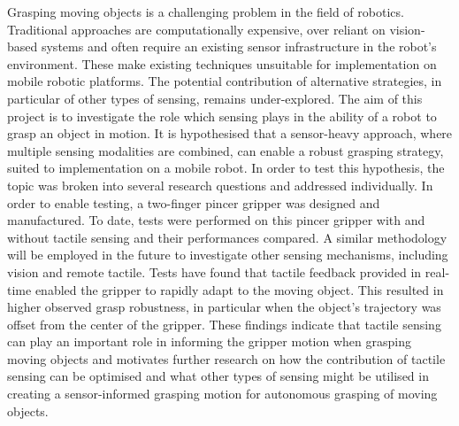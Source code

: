 % 
% 
%


Grasping moving objects is a challenging problem in the field of robotics. Traditional approaches are computationally expensive, over reliant on vision-based systems and often require an existing sensor infrastructure in the robot's environment. These make existing techniques unsuitable for implementation on mobile robotic platforms. The potential contribution of alternative strategies, in particular of other types of sensing, remains under-explored. 
The aim of this project is to investigate the role which sensing plays in the ability of a robot to grasp an object in motion. It is hypothesised that a sensor-heavy approach, where multiple sensing modalities are combined, can enable a robust grasping strategy, suited to implementation on a mobile robot.
In order to test this hypothesis, the topic was broken into several research questions and addressed individually. In order to enable testing, a two-finger pincer gripper was designed and manufactured. To date, tests were performed on this pincer gripper with and without tactile sensing and their performances compared. A similar methodology will be employed in the future to investigate other sensing mechanisms, including vision and remote tactile.
Tests have found that tactile feedback provided in real-time enabled the gripper to rapidly adapt to the moving object. This resulted in higher observed grasp robustness, in particular when the object's trajectory was offset from the center of the gripper. These findings indicate that tactile sensing can play an important role in informing the gripper motion when grasping moving objects and motivates further research on how the contribution of tactile sensing can be optimised and what other types of sensing might be utilised in creating a sensor-informed grasping motion for autonomous grasping of moving objects.




